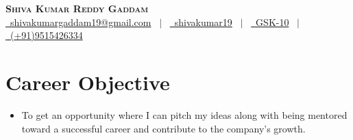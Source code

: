 \documentclass[12pt, a4paper]{article}
\begin{document}

\begin{center}
    \textbf{\Huge \scshape Shiva Kumar Reddy Gaddam} \\ \vspace{2pt}
    \href{mailto:shivakumargaddam19@gmail.com}{\raisebox{-0.05\height}\faEnvelope \ shivakumargaddam19@gmail.com} \ $|$ \ 
    \href{https://linkedin.com/in/shivakumar19}{\raisebox{-0.05\height}\faLinkedin\ shivakumar19} \ $|$ \
    \href{https://github.com/GSK-10}{\raisebox{-0.05\height}\faGithub\ GSK-10} \ $|$ \ 
    \href{tel:+919515426334}{\raisebox{-0.05\height}\faMobile \ (+91)9515426334} \\
\end{center}

\section{Career Objective}
    \begin{itemize}[leftmargin=0.15in, label={}]
        \item{ To get an opportunity where I can pitch my ideas along with being mentored toward a successful career and
contribute to the company's growth. }
    \end{itemize}
\vspace{-12pt}
\end{document}
